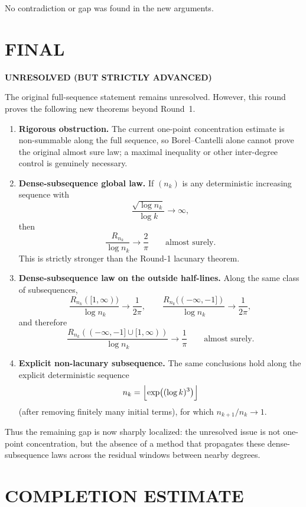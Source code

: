 No contradiction or gap was found in the new arguments.

\section{FINAL}

\noindent\textbf{UNRESOLVED (BUT STRICTLY ADVANCED)}

The original full-sequence statement remains unresolved. However, this round proves the following new theorems beyond Round~1.

\begin{enumerate}
\item \textbf{Rigorous obstruction.} The current one-point concentration estimate is non-summable along the full sequence, so Borel--Cantelli alone cannot prove the original almost sure law; a maximal inequality or other inter-degree control is genuinely necessary.

\item \textbf{Dense-subsequence global law.} If $(n_k)$ is any deterministic increasing sequence with
\[
\frac{\sqrt{\log n_k}}{\log k}\to\infty,
\]
then
\[
\frac{R_{n_k}}{\log n_k}\to\frac{2}{\pi}
\qquad\text{almost surely.}
\]
This is strictly stronger than the Round-1 lacunary theorem.

\item \textbf{Dense-subsequence law on the outside half-lines.} Along the same class of subsequences,
\[
\frac{R_{n_k}([1,\infty))}{\log n_k}\to\frac{1}{2\pi},
\qquad
\frac{R_{n_k}((-\infty,-1])}{\log n_k}\to\frac{1}{2\pi},
\]
and therefore
\[
\frac{R_{n_k}((-\infty,-1]\cup[1,\infty))}{\log n_k}\to\frac{1}{\pi}
\qquad\text{almost surely.}
\]

\item \textbf{Explicit non-lacunary subsequence.} The same conclusions hold along the explicit deterministic sequence
\[
 n_k=\Bigl\lfloor\exp\bigl((\log k)^3\bigr)\Bigr\rfloor
\]
(after removing finitely many initial terms), for which $n_{k+1}/n_k\to1$.
\end{enumerate}

Thus the remaining gap is now sharply localized: the unresolved issue is not one-point concentration, but the absence of a method that propagates these dense-subsequence laws across the residual windows between nearby degrees.

\section{COMPLETION ESTIMATE}

